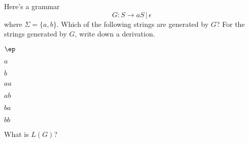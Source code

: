 Here's a grammar
\[
G : S \rightarrow aS \,|\, \epsilon
\]
where $\Sigma = \{a, b\}$.
Which of the following strings are generated by $G$?
For the strings generated by $G$, write down a derivation.
\begin{tightlist}
\item $\ep$
\item $a$
\item $b$
\item $aa$
\item $ab$
\item $ba$
\item $bb$
\end{tightlist}
What is $L(G)$?
